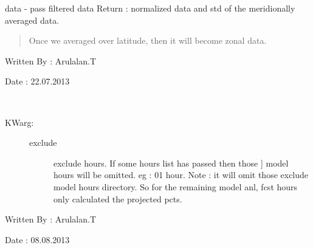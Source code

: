 \documentclass[letterpaper,10pt,english]{sphinxmanual}
\begin{document}

\begin{fulllineitems}
\label{mjo:ceof_diag.getZonalNormStd}
data - pass filtered data
Return : normalized data and std of the meridionally averaged data.
\begin{quote}

Once we averaged over latitude, then it will become zonal data.
\end{quote}

\end{fulllineitems}


\begin{fulllineitems}
\label{mjo:ceof_diag.makeGenCeofVars}
Written By : Arulalan.T

Date : 22.07.2013

\end{fulllineitems}


\begin{fulllineitems}
\label{mjo:ceof_diag.makeProjectedPcts}~\begin{description}
\item[{KWarg:}] \leavevmode\begin{description}
\item[{exclude}] \leavevmode{[}exclude hours. If some hours list has passed then those {]}
model hours will be omitted. eg : 01 hour.
Note : it will omit those exclude model hours directory.
So for the remaining model anl, fcst hours only calculated the
projected pcts.

\end{description}

\end{description}

Written By : Arulalan.T

Date : 08.08.2013

\end{fulllineitems}
\end{document}
